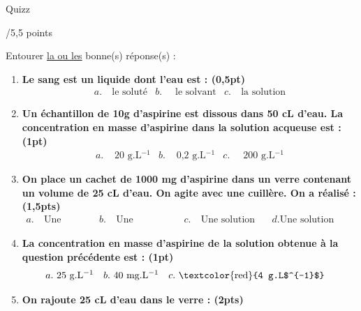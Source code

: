 \begin{doc}{Quizz \begin{large}
    /5,5 points
\end{large}}
Entourer \underline{la ou les} bonne(s) réponse(s) :
\begin{enumerate}
    \item \textbf{Le sang est un liquide dont l'eau est : (0,5pt)}
        \begin{align*}
            a.& ~\text{le soluté} & b.& ~\text{ le solvant} & c.& ~\text{la solution}
        \end{align*}
    \item \textbf{Un échantillon de 10g d’aspirine est dissous dans 50 cL d’eau. La concentration
en masse d’aspirine dans la solution acqueuse est : (1pt)}
        \begin{align*}
            a.& \text{ 20 g.L$^{-1}$} & b.& \text{ 0,2 g.L$^{-1}$} & c.& ~\text{ 200 g.L$^{-1}$}
        \end{align*}
    \item \textbf{On place un cachet de 1000 mg d'aspirine dans un verre contenant un volume de 25 cL d'eau. On agite avec une cuillère. On a réalisé : (1,5pts) }
        \begin{align*}
            a.& ~\text{Une dilution} & b.& ~\text{Une dissolution} & c.& ~\text{Une solution fille} d.& ~\text{Une solution aqueuse}
        \end{align*}
    \item \textbf{La concentration en masse d'aspirine de la solution obtenue à la question précédente est : (1pt)}
        \begin{align*}
            a.& ~\text{25 g.L$^{-1}$} & b.& ~\text{40 mg.L$^{-1}$} & c.& ~\text{\textcolor{red}{4 g.L$^{-1}$}}
        \end{align*}
    \item \textbf{On rajoute 25 cL d'eau dans le verre : (2pts)}
        \begin{enumerate}[label=\textit{\alph*.}, align=left, leftmargin=*]

\end{enumerate}
\end{enumerate}
\end{doc}
